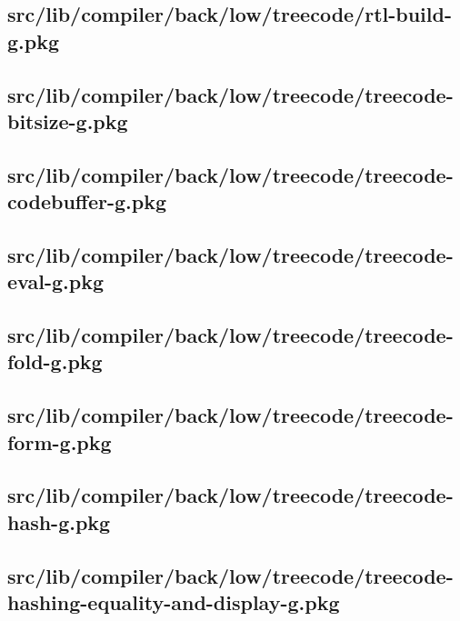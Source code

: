 \subsection{src/lib/compiler/back/low/treecode/rtl-build-g.pkg}


\subsection{src/lib/compiler/back/low/treecode/treecode-bitsize-g.pkg}


\subsection{src/lib/compiler/back/low/treecode/treecode-codebuffer-g.pkg}


\subsection{src/lib/compiler/back/low/treecode/treecode-eval-g.pkg}


\subsection{src/lib/compiler/back/low/treecode/treecode-fold-g.pkg}


\subsection{src/lib/compiler/back/low/treecode/treecode-form-g.pkg}


\subsection{src/lib/compiler/back/low/treecode/treecode-hash-g.pkg}


\subsection{src/lib/compiler/back/low/treecode/treecode-hashing-equality-and-display-g.pkg}


